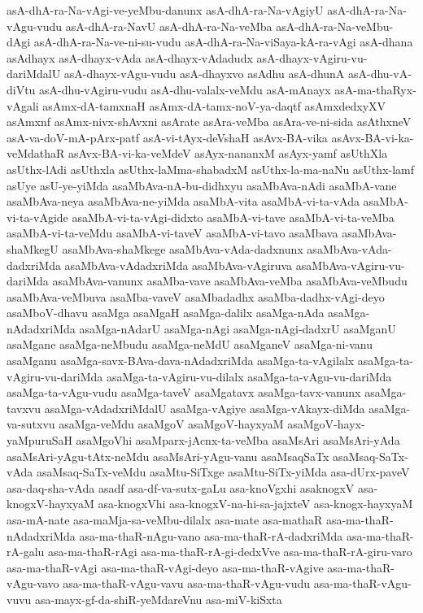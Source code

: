 {asA-dhA-ra-Na-vAgi-ve-yeMbu-danunx
asA-dhA-ra-Na-vAgiyU
asA-dhA-ra-Na-vAgu-vudu
asA-dhA-ra-NavU
asA-dhA-ra-Na-veMba
asA-dhA-ra-Na-veMbu-dAgi
asA-dhA-ra-Na-ve-ni-su-vudu
asA-dhA-ra-Na-viSaya-kA-ra-vAgi
asA-dhana
asAdhayx
asA-dhayx-vAda
asA-dhayx-vAdadudx
asA-dhayx-vAgiru-vu-dariMdalU
asA-dhayx-vAgu-vudu
asA-dhayxvo
asAdhu
asA-dhunA
asA-dhu-vA-diVtu
asA-dhu-vAgiru-vudu
asA-dhu-valalx-veMdu
asA-mAnayx
asA-ma-thaRyx-vAgali
asAmx-dA-tamxnaH
asAmx-dA-tamx-noV-ya-daqtf
asAmxdedxyXV
asAmxnf
asAmx-nivx-shAvxni
asArate
asAra-veMba
asAra-ve-ni-sida
asAthxneV
asA-va-doV-mA-pArx-patf
asA-vi-tAyx-deVshaH
asAvx-BA-vika
asAvx-BA-vi-ka-veMdathaR
asAvx-BA-vi-ka-veMdeV
asAyx-nananxM
asAyx-yamf
asUthXla
asUthx-lAdi
asUthxla
asUthx-laMma-shabadxM
asUthx-la-ma-naNu
asUthx-lamf
asUye
asU-ye-yiMda
asaMbAva-nA-bu-didhxyu
asaMbAva-nAdi
asaMbA-vane
asaMbAva-neya
asaMbAva-ne-yiMda
asaMbA-vita
asaMbA-vi-ta-vAda
asaMbA-vi-ta-vAgide
asaMbA-vi-ta-vAgi-didxto
asaMbA-vi-tave
asaMbA-vi-ta-veMba
asaMbA-vi-ta-veMdu
asaMbA-vi-taveV
asaMbA-vi-tavo
asaMbava
asaMbAva-shaMkegU
asaMbAva-shaMkege
asaMbAva-vAda-dadxnunx
asaMbAva-vAda-dadxriMda
asaMbAva-vAdadxriMda
asaMbAva-vAgiruva
asaMbAva-vAgiru-vu-dariMda
asaMbAva-vanunx
asaMba-vave
asaMbAva-veMba
asaMbAva-veMbudu
asaMbAva-veMbuva
asaMba-vaveV
asaMbadadhx
asaMba-dadhx-vAgi-deyo
asaMboV-dhavu
asaMga
asaMgaH
asaMga-dalilx
asaMga-nAda
asaMga-nAdadxriMda
asaMga-nAdarU
asaMga-nAgi
asaMga-nAgi-dadxrU
asaMganU
asaMgane
asaMga-neMbudu
asaMga-neMdU
asaMganeV
asaMga-ni-vanu
asaMganu
asaMga-savx-BAva-dava-nAdadxriMda
asaMga-ta-vAgilalx
asaMga-ta-vAgiru-vu-dariMda
asaMga-ta-vAgiru-vu-dilalx
asaMga-ta-vAgu-vu-dariMda
asaMga-ta-vAgu-vudu
asaMga-taveV
asaMgatavx
asaMga-tavx-vanunx
asaMga-tavxvu
asaMga-vAdadxriMdalU
asaMga-vAgiye
asaMga-vAkayx-diMda
asaMga-va-sutxvu
asaMga-veMdu
asaMgoV
asaMgoV-hayxyaM
asaMgoV-hayx-yaMpuruSaH
asaMgoVhi
asaMparx-jAcnx-ta-veMba
asaMsAri
asaMsAri-yAda
asaMsAri-yAgu-tAtx-neMdu
asaMsAri-yAgu-vanu
asaMsaqSaTx
asaMsaq-SaTx-vAda
asaMsaq-SaTx-veMdu
asaMtu-SiTxge
asaMtu-SiTx-yiMda
asa-dUrx-paveV
asa-daq-sha-vAda
asadf
asa-df-va-sutx-gaLu
asa-knoVgxhi
asaknogxV
asa-knogxV-hayxyaM
asa-knogxVhi
asa-knogxV-na-hi-sa-jajxteV
asa-knogx-hayxyaM
asa-mA-nate
asa-maMja-sa-veMbu-dilalx
asa-mate
asa-mathaR
asa-ma-thaR-nAdadxriMda
asa-ma-thaR-nAgu-vano
asa-ma-thaR-rA-dadxriMda
asa-ma-thaR-rA-galu
asa-ma-thaR-rAgi
asa-ma-thaR-rA-gi-dedxVve
asa-ma-thaR-rA-giru-varo
asa-ma-thaR-vAgi
asa-ma-thaR-vAgi-deyo
asa-ma-thaR-vAgive
asa-ma-thaR-vAgu-vavo
asa-ma-thaR-vAgu-vavu
asa-ma-thaR-vAgu-vudu
asa-ma-thaR-vAgu-vuvu
asa-mayx-gf-da-shiR-yeMdareVnu
asa-miV-kiSxta
}
